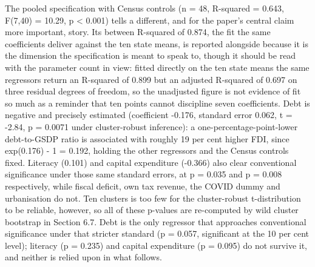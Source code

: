 \documentclass[12pt,a4paper]{article}
\begin{document}
The pooled specification with Census controls (n = 48, R-squared = 0.643, F(7,40) = 10.29, p < 0.001) tells a different, and for the paper's central claim more important, story. Its between R-squared of 0.874, the fit the same coefficients deliver against the ten state means, is reported alongside because it is the dimension the specification is meant to speak to, though it should be read with the parameter count in view: fitted directly on the ten state means the same regressors return an R-squared of 0.899 but an adjusted R-squared of 0.697 on three residual degrees of freedom, so the unadjusted figure is not evidence of fit so much as a reminder that ten points cannot discipline seven coefficients. Debt is negative and precisely estimated (coefficient -0.176, standard error 0.062, t = -2.84, p = 0.0071 under cluster-robust inference): a one-percentage-point-lower debt-to-GSDP ratio is associated with roughly 19 per cent higher FDI, since exp(0.176) - 1 = 0.192, holding the other regressors and the Census controls fixed. Literacy (0.101) and capital expenditure (-0.366) also clear conventional significance under those same standard errors, at p = 0.035 and p = 0.008 respectively, while fiscal deficit, own tax revenue, the COVID dummy and urbanisation do not. Ten clusters is too few for the cluster-robust t-distribution to be reliable, however, so all of these p-values are re-computed by wild cluster bootstrap in Section 6.7. Debt is the only regressor that approaches conventional significance under that stricter standard (p = 0.057, significant at the 10 per cent level); literacy (p = 0.235) and capital expenditure (p = 0.095) do not survive it, and neither is relied upon in what follows.
\end{document}
